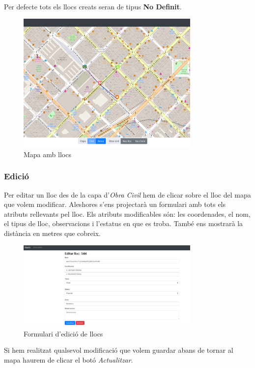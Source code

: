 \documentclass[a4paper]{article}
\begin{document}
	Per defecte tots els llocs creats seran de tipus \textbf{No Definit}.
	
	\begin{figure}[H]
		\centering
		\includegraphics[width=0.8\textwidth]{images/sites_map.png}
		\caption{Mapa amb llocs}
	\end{figure}

	\subsubsection{Edició}
	Per editar un lloc des de la capa d'\emph{Obra Civil} hem de clicar sobre el lloc del mapa que volem modificar. Aleshores s'ens projectarà un formulari amb tots els atributs rellevants pel lloc. Els atributs modificables són: les coordenades, el nom, el tipus de lloc, observacions i l'estatus en que es troba. També ens mostrarà la distància en metres que cobreix.
	
	\begin{figure}[H]
		\centering
		\includegraphics[width=0.8\textwidth]{images/sites_edit.png}
		\caption{Formulari d'edició de llocs}
	\end{figure}

	Si hem realitzat qualsevol modificació que volem guardar abans de tornar al mapa haurem de clicar el botó \emph{Actualitzar}.
	
\end{document}
